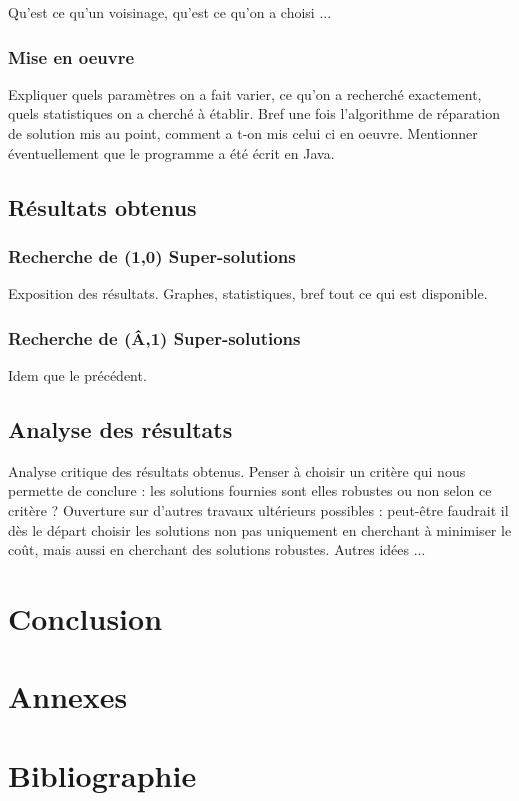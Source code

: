 \documentclass[11pt]{report}
\begin{document}
Qu'est ce qu'un voisinage, qu'est ce qu'on a choisi ...

\subsection{Mise en oeuvre}
Expliquer quels paramètres on a fait varier, ce qu'on a recherché exactement, quels statistiques on a cherché à établir. Bref une fois l'algorithme de réparation de solution mis au point, comment a t-on mis celui ci en oeuvre. Mentionner éventuellement que le programme a été écrit en Java.
\section{Résultats obtenus}
\subsection{Recherche de (1,0) Super-solutions}
Exposition des résultats. Graphes, statistiques, bref tout ce qui est disponible.
\subsection{Recherche de (Â,1) Super-solutions}
Idem que le précédent.
\section{Analyse des résultats}
Analyse critique des résultats obtenus. Penser à choisir un critère qui nous permette de conclure : les solutions fournies sont elles robustes ou non selon ce critère ?
Ouverture sur d'autres travaux ultérieurs possibles : peut-être faudrait il dès le départ choisir les solutions non pas uniquement en cherchant à minimiser le coût, mais aussi en cherchant des solutions robustes.
Autres idées ...

\chapter*{Conclusion}

\chapter*{Annexes}
\chapter*{Bibliographie}

\end{document}
